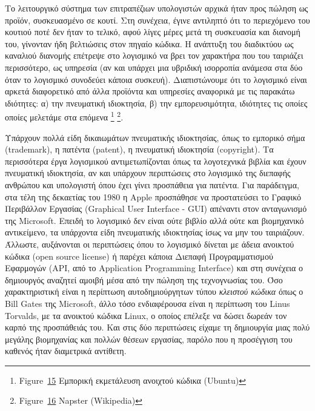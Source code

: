 \documentclass[
]{article}
\begin{document}
Το λειτουργικό σύστημα των επιτραπέζιων υπολογιστών αρχικά ήταν προς
πώληση ως προϊόν, συσκευασμένο σε κουτί. Στη συνέχεια, έγινε αντιληπτό
ότι το περιεχόμενο του κουτιού ποτέ δεν ήταν το τελικό, αφού λίγες μέρες
μετά τη συσκευασία και διανομή του, γίνονταν ήδη βελτιώσεις στον πηγαίο
κώδικα. Η ανάπτυξη του διαδικτύου ως καναλιού διανομής επέτρεψε στο
λογισμικό να βρει τον χαρακτήρα που του ταιριάζει περισσότερο, ως
υπηρεσία (αν και υπάρχει μια υβριδική ισορροπία ανάμεσα στα δύο όταν το
λογισμικό συνοδεύει κάποια συσκευή). Διαπιστώνουμε ότι το λογισμικό
είναι αρκετά διαφορετικό από άλλα προϊόντα και υπηρεσίες αναφορικά με
τις παρακάτω ιδιότητες: α) την πνευματική ιδιοκτησία, β) την
εμπορευσιμότητα, ιδιότητες τις οποίες οποίες μελετάμε στα επόμενα
\footnote{Figure~\protect\hyperlink{fig:linux}{15} Εμπορική εκμετάλευση
  ανοιχτού κώδικα (Ubuntu)} \footnote{Figure~\protect\hyperlink{fig:napster}{16}
  Napster (Wikipedia)}.

Υπάρχουν πολλά είδη δικαιωμάτων πνευματικής ιδιοκτησίας, όπως το
εμπορικό σήμα (trademark), η πατέντα (patent), η πνευματική ιδιοκτησία
(copyright). Τα περισσότερα έργα λογισμικού αντιμετωπίζονται όπως τα
λογοτεχνικά βιβλία και έχουν πνευματική ιδιοκτησία, αν και υπάρχουν
περιπτώσεις στο λογισμικό της διεπαφής ανθρώπου και υπολογιστή όπου έχει
γίνει προσπάθεια για πατέντα. Για παράδειγμα, στα τέλη της δεκαετίας του
1980 η Apple προσπάθησε να προστατεύσει το Γραφικό Περιβάλλον Εργασίας
(Graphical User Interface - GUI) απέναντι στον ανταγωνισμό της
Microsoft. Επειδή το λογισμικό δεν είναι ούτε βιβλίο αλλά ούτε και
βιομηχανικό αντικείμενο, τα υπάρχοντα είδη πνευματικής ιδιοκτησίας ίσως
να μην του ταιριάζουν. Άλλωστε, αυξάνονται οι περιπτώσεις όπου το
λογισμικό δίνεται με άδεια ανοικτού κώδικα (open source license) ή
παρέχει κάποια Διεπαφή Προγραμματισμού Εφαρμογών (API, από το
Application Programming Interface) και στη συνέχεια ο δημιουργός
αναζητεί αμοιβή μέσα από την πώληση της τεχνογνωσίας του. Όσο
χαρακτηριστική είναι η περίπτωση αυτοδημιούργητων τύπου \emph{κλειστού
κώδικα} όπως ο Bill Gates της Microsoft, άλλο τόσο ενδιαφέρουσα είναι η
περίπτωση του Linus Torvalds, με τα ανοικτού κώδικα Linux, ο οποίος
επέλεξε να δώσει δωρεάν τον καρπό της προσπάθειάς του. Και στις δύο
περιπτώσεις είχαμε τη δημιουργία μιας πολύ μεγάλης βιομηχανίας και
πολλών θέσεων εργασίας, παρόλο που η προσέγγιση του καθενός ήταν
διαμετρικά αντίθετη.
\end{document}
